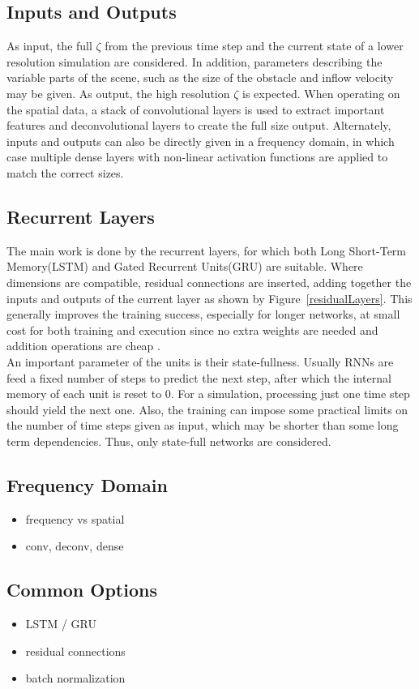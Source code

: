 \documentclass[sigconf]{acmart}
\begin{document}
\subsection{Inputs and Outputs}
As input, the full $\zeta$ from the previous time step and the current state of a lower resolution simulation are considered. 
In addition, parameters describing the variable parts of the scene, such as the size of the obstacle and inflow velocity may be given.
As output, the high resolution $\zeta$ is expected.
When operating on the spatial data, a stack of convolutional layers is used to extract important features and deconvolutional layers to create the full size output. Alternately, inputs and outputs can also be directly given in a frequency domain, in which case multiple dense layers with non-linear activation functions are applied to match the correct sizes.
\subsection{Recurrent Layers}
The main work is done by the recurrent layers, for which both Long Short-Term Memory(LSTM) and Gated Recurrent Units(GRU) are suitable. Where dimensions are compatible, residual connections are inserted, adding together the inputs and outputs of the current layer as shown by Figure~\ref{residualLayers}. This generally improves the training success, especially for longer networks, at small cost for both training and execution since no extra weights are needed and addition operations are cheap \cite{he2016deep}. \\
An important parameter of the units is their state-fullness. Usually RNNs are feed a fixed number of steps to predict the next step, after which the internal memory of each unit is reset to $0$. For a simulation, processing just one time step should yield the next one. Also, the training can impose some practical limits on the number of time steps given as input, which may be shorter than some long term dependencies. Thus, only state-full networks are considered.
\subsection{Frequency Domain}
\begin{itemize}
	\item frequency vs spatial
	\item conv, deconv, dense
\end{itemize}
\subsection{Common Options}
\begin{itemize}
	\item LSTM / GRU
	\item residual connections \cite{he2016deep}
	\item batch normalization
\end{itemize}
\end{document}
